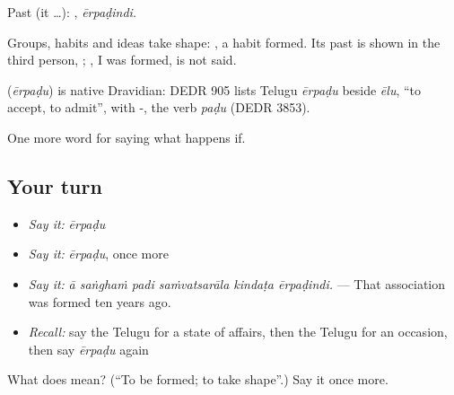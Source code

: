 Past (it …): , \emph{ērpaḍindi}.

Groups, habits and ideas take shape:  , a habit formed. Its past is shown in the third person, ; , I was formed, is not said.

\begin{cousinweb}
\textbf{} (\emph{ērpaḍu}) is native Dravidian: DEDR 905 lists Telugu \emph{ērpaḍu} beside \emph{ēlu}, \textquotedblleft{}to accept, to admit\textquotedblright{}, with -, the verb \emph{paḍu} (DEDR 3853).
\end{cousinweb}

\begin{grammarlens}[title={What you've built}]
One more word for saying what happens if.
\end{grammarlens}

\subsection*{Your turn}
\begin{itemize}
\raggedright
  \item \emph{Say it:} \emph{ērpaḍu}
  \item \emph{Say it:} \emph{ērpaḍu}, once more
  \item \emph{Say it:} \emph{ā saṅghaṁ padi saṁvatsarāla kindaṭa ērpaḍindi.} — That association was formed ten years ago.
  \item \emph{Recall:} say the Telugu for a state of affairs, then the Telugu for an occasion, then say \emph{ērpaḍu} again
\end{itemize}

\begin{tcolorbox}[breakable,colback=teal!4,colframe=teal!35!black,title={Before you move on}]
What does  mean? (\textquotedblleft{}To be formed; to take shape\textquotedblright{}.) Say it once more.
\end{tcolorbox}
